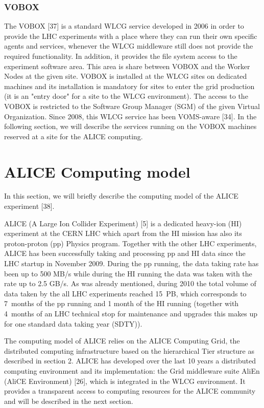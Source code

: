 \documentclass{intech}
\begin{document}
\subsubsection{VOBOX}
%
The VOBOX [37] is a standard WLCG service developed in 2006 in order
to provide the LHC experiments with a place where they can run their
own specific agents and services, whenever the WLCG middleware still
does not provide the required functionality. In addition, it
provides the file system access to the experiment software area.
This area is share between VOBOX and the Worker Nodes at the given
site.  VOBOX is installed at the WLCG sites on dedicated machines
and its installation is mandatory for sites to enter the grid
production (it is an "entry door" for a site to the WLCG
environment). The access to the VOBOX is restricted to the Software
Group Manager (SGM) of the given Virtual Organization. Since 2008,
this WLCG service has been VOMS-aware [34]. In the following
section, we will describe the services running on the VOBOX machines
reserved at a site for the ALICE computing.


\section{ALICE Computing model}

In this section, we will briefly describe the computing model of the
ALICE experiment [38].

ALICE (A Large Ion Collider Experiment) [5] is a dedicated heavy-ion
(HI) experiment at the CERN LHC which apart from the HI mission has
also its proton-proton (pp) Physics program. Together with the other
LHC experiments, ALICE has been successfully taking and processing
pp and HI data since the LHC startup in November 2009. During the pp
running, the data taking rate has been up to 500 MB/s while during
the HI running the data was taken with the rate up to 2.5 GB/s. As
was already mentioned, during 2010 the total volume of data taken by
the all LHC experiments reached 15~PB, which corresponds to 7~months
of the pp running and 1 month of the HI running (together with
4~months of an LHC technical stop for maintenance and upgrades this
makes up for one standard data taking year (SDTY)).

The computing model of ALICE relies on the ALICE Computing Grid, the
distributed computing infrastructure based on the hierarchical Tier
structure as described in section 2.  ALICE has developed over the
last 10 years a distributed computing environment and its
implementation: the Grid middleware suite AliEn (AliCE Environment)
[26], which is integrated in the WLCG environment. It provides a
transparent access to computing resources for the ALICE community
and will be described in the next section.
\end{document}
